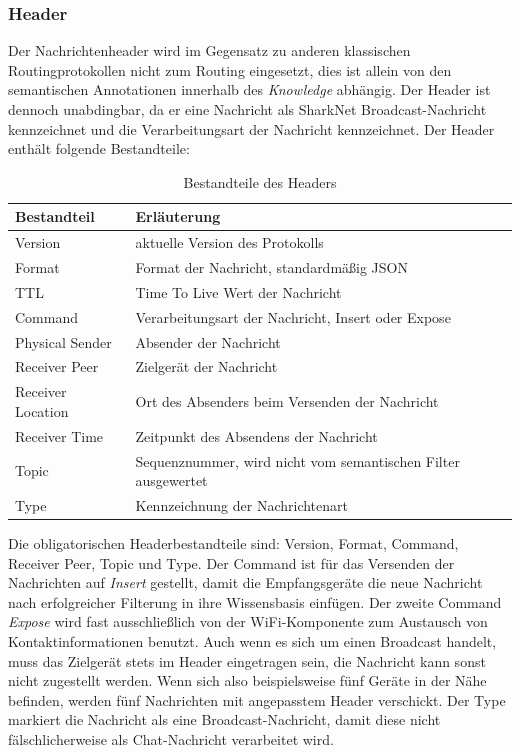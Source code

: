 \subsubsection{Header}
Der Nachrichtenheader wird im Gegensatz zu anderen klassischen Routingprotokollen nicht zum Routing eingesetzt, dies ist allein von den semantischen Annotationen innerhalb des \textit{Knowledge} abhängig. Der Header ist dennoch unabdingbar, da er eine Nachricht als SharkNet Broadcast-Nachricht kennzeichnet und die Verarbeitungsart der Nachricht kennzeichnet. Der Header enthält folgende Bestandteile:
\begin{table}[H]
	\begin{center}
		\caption{Bestandteile des Headers}
		\label{tab:messageHeader}
		\begin{tabular}{l|l} 			
			Bestandteil & Erläuterung \\
			\hline
			Version & aktuelle Version des Protokolls\\
			Format & Format der Nachricht, standardmäßig JSON\\
			TTL & Time To Live Wert der Nachricht\\
			Command & Verarbeitungsart der Nachricht, Insert oder Expose\\
			Physical Sender & Absender der Nachricht\\
			Receiver Peer & Zielgerät der Nachricht\\
			Receiver Location & Ort des Absenders beim Versenden der Nachricht\\
			Receiver Time & Zeitpunkt des Absendens der Nachricht\\
			Topic & Sequenznummer, wird nicht vom semantischen Filter ausgewertet\\
			Type & Kennzeichnung der Nachrichtenart\\							
		\end{tabular}
	\end{center}
\end{table}
Die obligatorischen Headerbestandteile sind: Version, Format, Command, Receiver Peer, Topic und Type. Der Command ist für das Versenden der Nachrichten auf \textit{Insert} gestellt, damit die Empfangsgeräte die neue Nachricht nach erfolgreicher Filterung in ihre Wissensbasis einfügen. Der zweite Command \textit{Expose} wird fast ausschließlich von der WiFi-Komponente zum Austausch von Kontaktinformationen benutzt. Auch wenn es sich um einen Broadcast handelt, muss das Zielgerät stets im Header eingetragen sein, die Nachricht kann sonst nicht zugestellt werden. Wenn sich also beispielsweise fünf Geräte in der Nähe befinden, werden fünf Nachrichten mit angepasstem Header verschickt. Der Type markiert die Nachricht als eine Broadcast-Nachricht, damit diese nicht fälschlicherweise als Chat-Nachricht verarbeitet wird.
